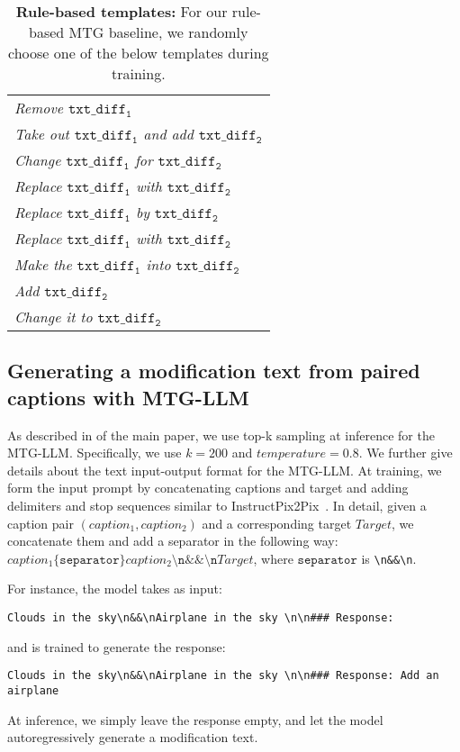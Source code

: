 \begin{table}\centering
\caption{\textbf{Rule-based templates:}
For our rule-based MTG baseline, we randomly
choose one of the below templates during training.
}
    \begin{tabular}{l}
    \toprule
    \textit{Remove $\mathtt{txt\_diff_1}$ }\\
    \textit{Take out $\mathtt{txt\_diff_1}$ and add $\mathtt{txt\_diff_2}$ } \\
    \textit{Change $\mathtt{txt\_diff_1}$ for $\mathtt{txt\_diff_2}$ } \\
    \textit{Replace $\mathtt{txt\_diff_1}$ with $\mathtt{txt\_diff_2}$ } \\
    \textit{Replace $\mathtt{txt\_diff_1}$ by $\mathtt{txt\_diff_2}$ } \\
    \textit{Replace $\mathtt{txt\_diff_1}$ with $\mathtt{txt\_diff_2}$ } \\
    \textit{Make the $\mathtt{txt\_diff_1}$ into $\mathtt{txt\_diff_2}$ } \\
    \textit{Add $\mathtt{txt\_diff_2}$ } \\
    \textit{Change it to $\mathtt{txt\_diff_2}$ } \\
    \bottomrule
\end{tabular}
\label{tab:rule-based-templates}
\end{table} 
\subsection{Generating a modification text from paired captions with MTG-LLM}
\label{app:subsec:mtg-llm}
As described in
\if{} \fi
of the main paper,
we use top-k sampling at inference for the MTG-LLM. 
Specifically, we use $k=200$ and $temperature=0.8$.
We further give details about the text input-output format for the MTG-LLM.
At training, we form the input prompt by concatenating captions and target and adding delimiters and stop sequences similar to InstructPix2Pix~\cite{brooks2022instructpix2pix}.
In detail, given a caption pair $(caption_1, caption_2)$ and a corresponding target $Target$, we concatenate them and add a separator in the following way: $caption_1\mathtt{\{separator\}}caption_2\texttt{\textbackslash n\&\&\textbackslash n}Target$,
where $\mathtt{separator}$ is \texttt{\textbackslash n\&\&\textbackslash n}.

For instance, the model takes as input:
\begin{lstlisting}[breaklines, backgroundcolor = \color{backcolour}]
    Clouds in the sky\n&&\nAirplane in the sky \n\n### Response:
\end{lstlisting}
and is trained to generate the response:
\begin{lstlisting}[breaklines, backgroundcolor = \color{backcolour}]
    Clouds in the sky\n&&\nAirplane in the sky \n\n### Response: Add an airplane
\end{lstlisting}
At inference, we simply leave the response empty, and let the model autoregressively generate a modification text.

